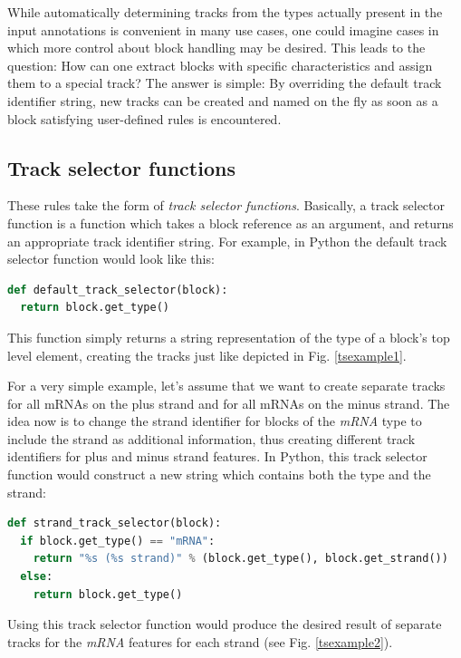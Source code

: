 \documentclass[a4paper]{scrreprt}
\begin{document}
While automatically determining tracks from the types actually present in the input annotations is convenient in many use cases, one could imagine cases in which more control about block handling may be desired. This leads to the question: How can one extract blocks with specific characteristics and assign them to a special track? The answer is simple: By overriding the default track identifier string, new tracks can be created and named on the fly as soon as a block satisfying user-defined rules is encountered.

\subsection{Track selector functions}

These rules take the form of \emph{track selector functions}. Basically, a track selector function is a function which takes a block reference as an argument, and returns an appropriate track identifier string. For example, in Python the default track selector function would look like this:
\begin{lstlisting}[language=Python, showstringspaces=false,numbers=none,frame=single]
def default_track_selector(block):
  return block.get_type()
\end{lstlisting}

This function simply returns a string representation of the type of a block's top level element, creating the tracks just like depicted in Fig. \ref{tsexample1}.

For a very simple example, let's assume that we want to create separate tracks for all mRNAs on the plus strand and for all mRNAs on the minus strand. The idea now is to change the strand identifier for blocks of the \emph{mRNA} type to include the strand as additional information, thus creating different track identifiers for plus and minus strand features. In Python, this track selector function would construct a new string which contains both the type and the strand:

\begin{lstlisting}[language=Python, showstringspaces=false,numbers=none,frame=single]
def strand_track_selector(block):
  if block.get_type() == "mRNA":
    return "%s (%s strand)" % (block.get_type(), block.get_strand())
  else:
    return block.get_type()
\end{lstlisting}

Using this track selector function would produce the desired result of separate tracks for the \emph{mRNA} features for each strand (see Fig. \ref{tsexample2}).
\end{document}
